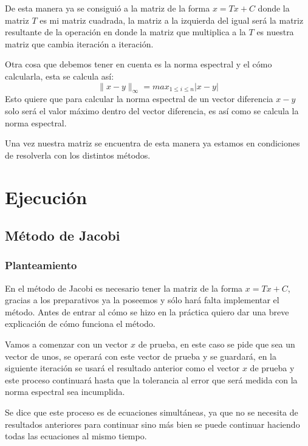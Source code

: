 \documentclass{article}
\providecommand{\abs}[1]{\lvert#1\rvert}
\providecommand{\norm}[1]{\lVert#1\rVert}
\begin{document}
De esta manera ya se consiguió a la matriz de la forma $x = Tx + C$ donde la matriz $T$ es
mi matriz cuadrada, la matriz a la izquierda del igual será la matriz resultante de la operación
en donde la matriz que multiplica a la $T$ es nuestra matriz que cambia iteración a iteración.


Otra cosa que debemos tener en cuenta es la norma espectral y el cómo calcularla, esta se calcula así:
\begin{equation*}
   \norm{x-y}_\infty = max_{1\leq i \leq n} \abs{x-y}
\end{equation*}
Esto quiere que para calcular la norma espectral de un vector diferencia $x-y$ solo será el valor máximo
dentro del vector diferencia, es así como se calcula la norma espectral.




Una vez nuestra matriz se encuentra de esta manera ya estamos en condiciones de resolverla con los
distintos métodos.


\section{Ejecución}
\subsection{Método de Jacobi}
\subsubsection{Planteamiento}
En el método de Jacobi es necesario tener la matriz de la forma $x = Tx + C$, gracias a los preparativos
ya la poseemos y sólo hará falta implementar el método. Antes de entrar al cómo se hizo en la práctica quiero
dar una breve explicación de cómo funciona el método.


Vamos a comenzar con un vector $x$ de prueba, en este caso se pide que sea un vector de unos, se operará con este
vector de prueba y se guardará, en la siguiente iteración se usará el resultado anterior como el vector $x$ de prueba
y este proceso continuará hasta que la tolerancia al error que será medida con la norma espectral sea incumplida.


Se dice que este proceso es de ecuaciones simultáneas, ya que no se necesita de resultados anteriores para continuar
sino más bien se puede continuar haciendo todas las ecuaciones al mismo tiempo.
\end{document}
